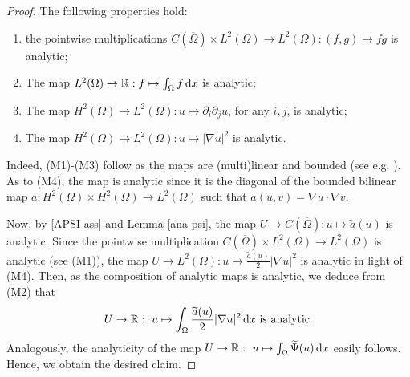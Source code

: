 \documentclass[11pt,reqno]{amsart}
\theoremstyle{remark}
\def\R{\mathbb{R}}
\def\d{{\rm d}}
\numberwithin{equation}{section}
\def\d{{\rm d}}
\begin{document}
\begin{proof}
The following properties hold:
 \begin{enumerate}
 \item[(M1)] the pointwise multiplications $C(\overline{\Omega})\times L^2(\Omega)\to L^2(\Omega): (f,g) \mapsto fg$ is analytic;
 \smallskip
 \item[(M2)] The map $L^2(\Omega)\to\R : f\mapsto \int_\Omega f \, \d x$ is analytic;
  \smallskip
 \item[(M3)] The map $H^2(\Omega)\to L^2(\Omega): u \mapsto \partial_i\partial_j u$, for any $i, j$, is analytic;
  \smallskip
\item[(M4)] The map $H^2(\Omega)\to L^2(\Omega): u\mapsto |\nabla u|^2$ is analytic.
\end{enumerate}
Indeed, (M1)-(M3) follow as the maps are (multi)linear and bounded (see e.g. \cite[Example 2.3]{RUPP}). As to (M4), the map is analytic since it is the diagonal of the bounded bilinear map $a: H^2(\Omega)\times H^2(\Omega)\to L^2(\Omega)$ such that $a(u,v)=\nabla u\cdot \nabla v$.

Now, by \eqref{APSI-ass} and Lemma \ref{ana-psi}, the map $U\to C(\overline{\Omega}): u\mapsto \widetilde{a}(u)$ is analytic.
Since the pointwise multiplication $C(\overline{\Omega})\times L^2(\Omega)\to L^2(\Omega)$ is analytic (see (M1)), the map $U\to L^2(\Omega):u\mapsto \frac{\widetilde{a}(u)}{2}|\nabla u|^2$
is analytic in light of (M4). Then, as the composition of analytic maps is analytic, we deduce from (M2) that
$$
 U\to \R : \ u\mapsto \int_\Omega \frac{\widetilde{a}(u)}{2}|\nabla u|^2 \, \d x \text{ is analytic.}
$$
Analogously, the analyticity of the map $U\to \R: \ u\mapsto \int_\Omega \widetilde{\Psi}(u)\, \d x$ easily follows. Hence, we obtain the desired claim.
\end{proof}
\end{document}
